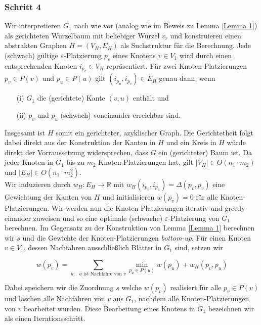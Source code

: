 \documentclass[a4paper, 12pt, twoside]{article}
\theoremstyle{Format1} %
\begin{document}
\subsubsection{Schritt 4}
Wir interpretieren $G_1$ nach wie vor (analog wie im Beweis zu Lemma \ref{Lemma 1}) als gerichteten Wurzelbaum  mit beliebiger Wurzel $v_r$ und
konstruieren einen abstrakten Graphen $H = (V_H, E_H)$ als Suchstruktur für die Berechnung.
Jede (schwach) gültige $\varepsilon$-Platzierung $p_v$ eines Knotens $v \in V_1$ wird durch einen entsprechenden Knoten $i_{p_v} \in V_H$ repräsentiert.
Für zwei Knoten-Platzierungen $p_v \in P(v)$ und $p_u \in P(u)$ gilt $(i_{p_u},i_{p_v}) \in E_H$ genau dann, wenn

\begin{enumerate}
	\item[(i)] $G_1$ die (gerichtete) Kante $(v,u)$ enthält und
	\item[(ii)] $p_v$ und $p_u$ (schwach) voneinander erreichbar sind.
\end{enumerate}

Insgesamt ist $H$ somit ein gerichteter, azyklischer Graph. Die Gerichtetheit folgt dabei direkt aus der Konstruktion der Kanten in $H$ und
ein Kreis in $H$ würde direkt der Vorraussetzung widersprechen, dass $G$ ein (gerichteter) Baum ist.
Da jeder Knoten in $G_1$ bis zu $m_2$ Knoten-Platzierungen hat, gilt $|V_H| \in O(n_1 \cdot m_2)$ und $|E_H| \in O(n_1 \cdot m_2^2)$.
\\
Wir induzieren durch $w_H: E_H \to \mathbb{R}$ mit $w_H(i_{p_v},i_{p_u}) = \Delta(p_v,p_v)$ eine Gewichtung der Kanten von $H$ und
initialisieren $w(p_v) = 0$ für alle Knoten-Platzierungen.
Wir werden nun die Knoten-Platzierungen iterativ und greedy einander zuweisen und so eine optimale (schwache) $\varepsilon$-Platzierung von $G_1$ berechnen.
Im Gegensatz zu der Konstruktion von Lemma \ref{Lemma 1} berechnen wir $s$ und die Gewichte der Knoten-Platzierungen \textit{bottom-up}.
Für einen Knoten $v \in V_1$, dessen Nachfahren ausschließlich Blätter in $G_1$ sind, setzen wir

\begin{equation}
	w(p_v) = \sum_{\text{$u:$ $u$ ist Nachfahre von $v$}} \min_{p_u \in P(u)} w(p_u) + w_H(p_v,p_u) \label{optimal placements}
\end{equation}

Dabei speichern wir die Zuordnung $s$ welche $w(p_v)$ realisiert für alle $p_v \in P(v)$ und löschen alle Nachfahren von $v$ aus $G_1$,
nachdem alle Knoten-Platzierungen von $v$ bearbeitet wurden.
Diese Bearbeitung eines Knotens in $G_1$ bezeichnen wir als einen Iterationsschritt. \label{Iterationsschritt}
\end{document}
